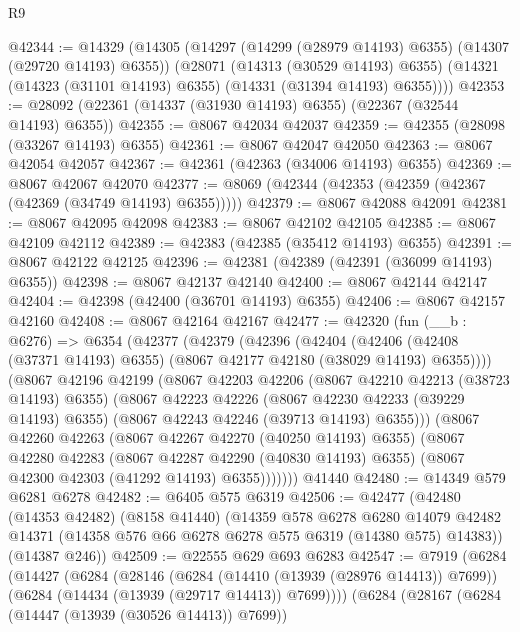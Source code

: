 \begin{lexlean}{R9}
\begin{coremodule}
@42344 := @14329
    (@14305
      (@14297 (@14299 (@28979 @14193) @6355) (@14307 (@29720 @14193) @6355))
      (@28071
        (@14313 (@30529 @14193) @6355)
        (@14321 (@14323 (@31101 @14193) @6355) (@14331 (@31394 @14193) @6355))))
@42353 := @28092 (@22361 (@14337 (@31930 @14193) @6355) (@22367 (@32544 @14193) @6355))
@42355 := @8067 @42034 @42037
@42359 := @42355 (@28098 (@33267 @14193) @6355)
@42361 := @8067 @42047 @42050
@42363 := @8067 @42054 @42057
@42367 := @42361 (@42363 (@34006 @14193) @6355)
@42369 := @8067 @42067 @42070
@42377 := @8069 (@42344 (@42353 (@42359 (@42367 (@42369 (@34749 @14193) @6355)))))
@42379 := @8067 @42088 @42091
@42381 := @8067 @42095 @42098
@42383 := @8067 @42102 @42105
@42385 := @8067 @42109 @42112
@42389 := @42383 (@42385 (@35412 @14193) @6355)
@42391 := @8067 @42122 @42125
@42396 := @42381 (@42389 (@42391 (@36099 @14193) @6355))
@42398 := @8067 @42137 @42140
@42400 := @8067 @42144 @42147
@42404 := @42398 (@42400 (@36701 @14193) @6355)
@42406 := @8067 @42157 @42160
@42408 := @8067 @42164 @42167
@42477 := @42320
    (fun (__b : @6276) =>
    @6354
      (@42377
        (@42379
          (@42396
            (@42404
              (@42406 (@42408 (@37371 @14193) @6355) (@8067 @42177 @42180 (@38029 @14193) @6355))))
          (@8067
            @42196
            @42199
            (@8067
              @42203
              @42206
              (@8067 @42210 @42213 (@38723 @14193) @6355)
              (@8067
                @42223
                @42226
                (@8067 @42230 @42233 (@39229 @14193) @6355)
                (@8067 @42243 @42246 (@39713 @14193) @6355)))
            (@8067
              @42260
              @42263
              (@8067 @42267 @42270 (@40250 @14193) @6355)
              (@8067
                @42280
                @42283
                (@8067 @42287 @42290 (@40830 @14193) @6355)
                (@8067 @42300 @42303 (@41292 @14193) @6355)))))))
    @41440
@42480 := @14349 @579 @6281 @6278
@42482 := @6405 @575 @6319
@42506 := @42477
    (@42480
      (@14353 @42482)
      (@8158 @41440)
      (@14359
        @578
        @6278
        @6280
        @14079
        @42482
        @14371
        (@14358 @576 @66 @6278 @6278 @575 @6319 (@14380 @575) @14383))
      (@14387 @246))
@42509 := @22555 @629 @693 @6283
@42547 := @7919
    (@6284
      (@14427
        (@6284
          (@28146
            (@6284 (@14410 (@13939 (@28976 @14413)) @7699))
            (@6284 (@14434 (@13939 (@29717 @14413)) @7699))))
        (@6284
          (@28167
            (@6284 (@14447 (@13939 (@30526 @14413)) @7699))

\end{coremodule}
\end{lexlean}
